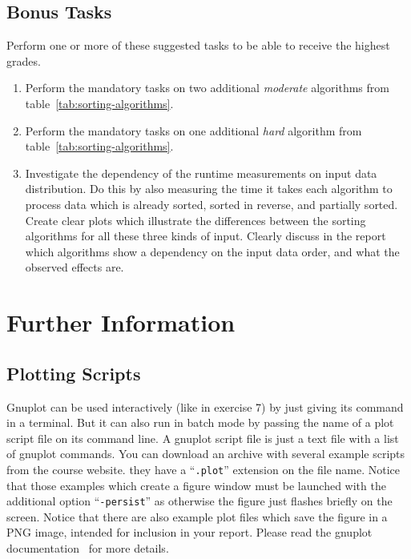 \documentclass[a4paper,10pt]{article}
\begin{document}
\subsection*{Bonus Tasks}

Perform one or more of these suggested tasks to be able to receive the highest grades.

\begin{enumerate}
  
\item
  Perform the mandatory tasks on two additional \emph{moderate} algorithms from table~\ref{tab:sorting-algorithms}.
  
\item
  Perform the mandatory tasks on one additional \emph{hard} algorithm from table~\ref{tab:sorting-algorithms}.
  
\item
  Investigate the dependency of the runtime measurements on input data distribution.
  Do this by also measuring the time it takes each algorithm to process data which is already sorted, sorted in reverse, and partially sorted.
  Create clear plots which illustrate the differences between the sorting algorithms for all these three kinds of input.
  Clearly discuss in the report which algorithms show a dependency on the input data order, and what the observed effects are.
  
\end{enumerate}



\section*{Further Information}



\subsection*{Plotting Scripts}

Gnuplot can be used interactively (like in exercise 7) by just giving its command in a terminal.
But it can also run in batch mode by passing the name of a plot script file on its command line.
A gnuplot script file is just a text file with a list of gnuplot commands.
You can download an archive with several example scripts from the course website.
they have a ``\texttt{.plot}'' extension on the file name.
Notice that those examples which create a figure window must be launched with the additional option ``\texttt{-persist}'' as otherwise the figure just flashes briefly on the screen.
Notice that there are also example plot files which save the figure in a PNG image, intended for inclusion in your report.
Please read the gnuplot documentation~\cite{gnuplot} for more details.
\end{document}
